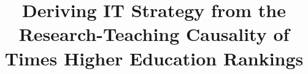 \documentclass[a4paper, conference]{IEEEtran}
\begin{document}
%

\title{Deriving IT Strategy from the Research-Teaching Causality of Times Higher Education Rankings}
\end{document}
